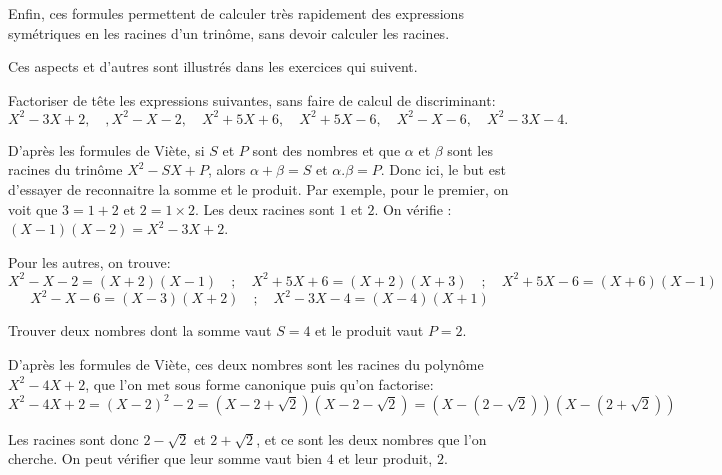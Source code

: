 Enfin, ces formules permettent de calculer très rapidement des expressions symétriques en les racines d'un trinôme, sans devoir calculer les racines.

Ces aspects et d'autres sont illustrés dans les exercices qui suivent.


\begin{exo}
 Factoriser de tête  les expressions suivantes, sans faire de calcul de discriminant:
\[X^2-3X+2,\quad, X^2-X-2,\quad X^2+5X+6, \quad X^2+5X-6, \quad X^2-X-6,\quad X^2-3X-4.\]
\begin{sol}
D'après les formules de Viète, si $S$ et $P$ sont des nombres et que $\alpha$ et $\beta$ sont les racines du trinôme $X^2-SX+P$, alors $\alpha+\beta =S$ et $\alpha.\beta = P$. Donc ici, le but est d'essayer de reconnaitre la somme et le produit. Par exemple, pour le premier, on \og voit\fg{} que $3=1+2$ et $2=1\times 2$. Les deux racines sont $1$ et $2$. On vérifie : $(X-1)(X-2) = X^2-3X+2$.


Pour les autres, on trouve:
\[
X^2-X-2= (X+2)(X-1)
\quad;\quad
X^2+5X+6 = (X+2)(X+3)
\quad;\quad
X^2+5X-6 = (X+6)(X-1)
\]
\[
X^2-X-6 = (X-3)(X+2)
\quad;\quad
X^2-3X-4 = (X-4)(X+1)
\]


\end{sol}
\end{exo}

\begin{exo}
Trouver deux nombres dont la somme vaut $S=4$ et le produit vaut $P=2$.
\begin{sol}
D'après les formules de Viète, ces deux nombres sont les racines du polynôme $X^2-4X+2$, que l'on met sous forme canonique puis qu'on factorise:
\[X^2-4X+2 = (X-2)^2 -2 = (X-2+\sqrt 2)(X-2-\sqrt 2) = (X-(2-\sqrt 2))(X-(2+\sqrt 2))\] 

Les racines sont donc  $2- \sqrt 2$ et $2+ \sqrt 2$, et ce sont les deux nombres que l'on cherche. On peut vérifier que leur somme vaut bien $4$ et leur produit, $2$.
\end{sol}
\end{exo}



